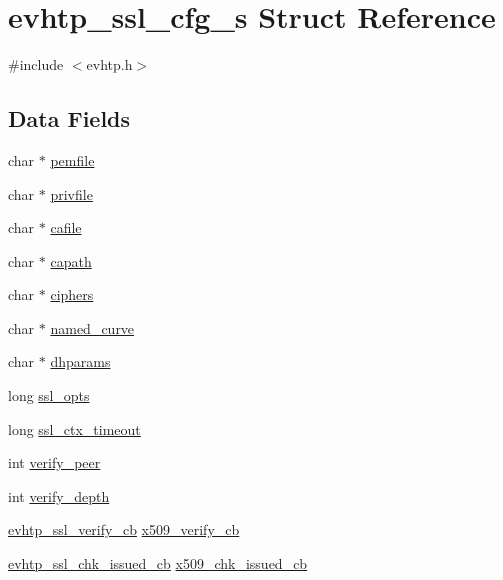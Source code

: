 \hypertarget{structevhtp__ssl__cfg__s}{\section{evhtp\-\_\-ssl\-\_\-cfg\-\_\-s \-Struct \-Reference}
\label{structevhtp__ssl__cfg__s}
}


{\ttfamily \#include $<$evhtp.\-h$>$}

\subsection*{\-Data \-Fields}
\begin{DoxyCompactItemize}
\item 
char $\ast$ \hyperlink{structevhtp__ssl__cfg__s_a166ccef38a88683b0b0896eecb4994e1}{pemfile}
\item 
char $\ast$ \hyperlink{structevhtp__ssl__cfg__s_a316b5f5b982f40f1492e9b732af977f4}{privfile}
\item 
char $\ast$ \hyperlink{structevhtp__ssl__cfg__s_a9ff8d56644bac1d41f8039f2fde5acf2}{cafile}
\item 
char $\ast$ \hyperlink{structevhtp__ssl__cfg__s_a8331a8443119478cd6b1daeb707a94dc}{capath}
\item 
char $\ast$ \hyperlink{structevhtp__ssl__cfg__s_a3e4edb91e89d3cffda8059a32d60e0e8}{ciphers}
\item 
char $\ast$ \hyperlink{structevhtp__ssl__cfg__s_a4f6c3b50f60ca2a30cfa2d6ce71950b6}{named\-\_\-curve}
\item 
char $\ast$ \hyperlink{structevhtp__ssl__cfg__s_ab62d5f6ab6c588676abce7410db0a178}{dhparams}
\item 
long \hyperlink{structevhtp__ssl__cfg__s_a1132f6a904a8decf77db2cbf4ff14d75}{ssl\-\_\-opts}
\item 
long \hyperlink{structevhtp__ssl__cfg__s_a13019a5b9cc55530a286c6a2d398e49a}{ssl\-\_\-ctx\-\_\-timeout}
\item 
int \hyperlink{structevhtp__ssl__cfg__s_ae9286c319acb85537c44e2eb86bf546e}{verify\-\_\-peer}
\item 
int \hyperlink{structevhtp__ssl__cfg__s_af960941c08b45889252b28b3dac628c7}{verify\-\_\-depth}
\item 
\hyperlink{evhtp_8h_aae103879bdf55f4aad47ec9350f984f4}{evhtp\-\_\-ssl\-\_\-verify\-\_\-cb} \hyperlink{structevhtp__ssl__cfg__s_afcc514daa3570553ab171826205601c6}{x509\-\_\-verify\-\_\-cb}
\item 
\hyperlink{evhtp_8h_a088f90dd658dee8631fcd3a945989fbd}{evhtp\-\_\-ssl\-\_\-chk\-\_\-issued\-\_\-cb} \hyperlink{structevhtp__ssl__cfg__s_a886c9bdf3d0ff43ec0ddca4eec2038bf}{x509\-\_\-chk\-\_\-issued\-\_\-cb}

\end{DoxyCompactItemize}
